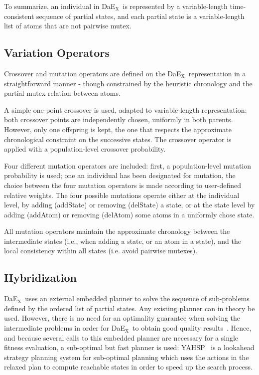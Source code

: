 \documentclass{llncs}
\def\DAEX{{\sc DaE$_{\text{X}}$}}
\def\YAHSP{{\sc YAHSP}}
\begin{document}
To summarize, an individual in \DAEX\ is represented by a variable-length time-consistent sequence of partial states, and each partial state is a variable-length list of atoms that are not pairwise mutex. 

\subsection{Variation Operators}

Crossover and mutation operators are defined on the \DAEX\ representation in a straightforward manner - though constrained by the heuristic chronology and the partial mutex relation between atoms.

A simple one-point crossover is used, adapted to variable-length representation: both crossover points are independently chosen, uniformly in both parents. However, only one offspring is kept, the one that respects the approximate chronological constraint on the successive states. The crossover operator is applied with a population-level crossover probability.

Four different mutation operators are included: first, a population-level mutation probability is used; one an individual has been designated for mutation, the choice between the four mutation operators is made according to user-defined relative weights.
The four possible mutations operate either at the individual level, by adding (addState) or removing (delState) a state, or at the state level by adding (addAtom) or removing (delAtom) some atoms in a uniformly chose state. 

All mutation operators maintain the approximate chronology between the intermediate states (i.e., when adding a state, or an atom in a state), and the local consistency within all states (i.e. avoid pairwise mutexes).

\subsection{Hybridization}
\DAEX\ uses an external embedded planner to solve the sequence of sub-problems defined by the ordered list of partial states.
Any existing planner can in theory be used. However, there is no need for an optimality guarantee when solving the intermediate problems in order for \DAEX\ to obtain good quality results~\cite{Bibai2010}. Hence, and because several calls to this embedded planner are necessary for a single fitness evaluation, a sub-optimal but fast planner is used: \YAHSP~\cite{Vidal2004} is a lookahead 
strategy planning system for sub-optimal planning which uses the  actions in the relaxed plan to compute reachable states in order to speed up the search process.
\end{document}
